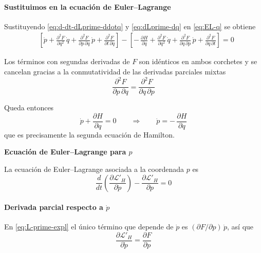 \documentclass{article}
\begin{document}
\paragraph{Sustituimos en la ecuación de Euler–Lagrange}

Sustituyendo \eqref{eq:d-dt-dLprime-ddotq} y \eqref{eq:dLprime-dq} en
\eqref{eq:EL-q} se obtiene
\begin{equation}
\begin{split}
  &\left[
    \dot p
    + \frac{\partial^{2}F}{\partial q^{2}}\,\dot q
    + \frac{\partial^{2}F}{\partial p\,\partial q}\,\dot p
    + \frac{\partial^{2}F}{\partial t\,\partial q}
  \right]
  -
  \left[
    -\,\frac{\partial H}{\partial q}
    + \frac{\partial^{2}F}{\partial q^{2}}\,\dot q
    + \frac{\partial^{2}F}{\partial q\,\partial p}\,\dot p
    + \frac{\partial^{2}F}{\partial q\,\partial t}
  \right]
  = 0
\end{split}
\end{equation}

Los términos con segundas derivadas de $F$ son idénticos en ambos corchetes
y se cancelan gracias a la conmutatividad de las derivadas parciales mixtas
\[
\frac{\partial^{2}F}{\partial p\,\partial q}
=
\frac{\partial^{2}F}{\partial q\,\partial p}
\]

Queda entonces
\begin{equation}
  \dot p + \frac{\partial H}{\partial q} = 0
  \qquad\Rightarrow\qquad
  \dot p = -\,\frac{\partial H}{\partial q}
  \label{eq:hamilton-p}
\end{equation}
que es precisamente la segunda ecuación de Hamilton.

\textcolor{trueblue}{\textbf{Ecuación de Euler–Lagrange para $p$}}

La ecuación de Euler–Lagrange asociada a la coordenada $p$ es
\begin{equation}
  \frac{d}{dt}
  \left(
    \frac{\partial \mathcal{L}'_{H}}{\partial \dot p}
  \right)
  -
  \frac{\partial \mathcal{L}'_{H}}{\partial p}
  = 0
  \label{eq:EL-p}
\end{equation}

\paragraph{Derivada parcial respecto a $\dot p$}

En \eqref{eq:L-prime-expl} el único término que depende de $\dot p$ es
$(\partial F/\partial p)\,\dot p$, así que
\begin{equation}
  \frac{\partial \mathcal{L}'_{H}}{\partial \dot p}
  = \frac{\partial F}{\partial p}
  \label{eq:dLprime-ddotp}
\end{equation}
\end{document}
